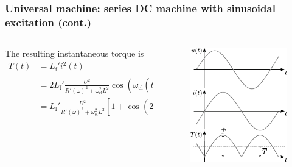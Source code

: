 \begin{frame}
	\frametitle{Universal machine: series DC machine with sinusoidal excitation (cont.)}
	\begin{columns}
		\begin{column}{0.55\textwidth}
		The resulting instantaneous torque is
		\begin{equation*}
		\begin{split}
			T(t) &= L_\mathrm{f}' i^2(t)\\
				 &= 2L_\mathrm{f}'\frac{U^2}{R'(\omega)^2+\omega_\mathrm{el}^2L^2}\cos\left(\omega_\mathrm{el}(t-\frac{L}{R'(\omega)})\right)^2\\
				 &= L_\mathrm{f}'\frac{U^2}{R'(\omega)^2+\omega_\mathrm{el}^2L^2}\left[1+\cos\left(2\omega_\mathrm{el}(t-\frac{L}{R'(\omega)})\right)\right].	
		\end{split}
	\end{equation*}
	\end{column}
\hfill
\begin{column}{0.45\textwidth}
	\begin{figure}
		\centering
		\includegraphics[scale=1.05]{fig/lec03/Universal_machine_time_signals.pdf}
	\end{figure}
\end{column}
\end{columns}
\end{frame}

